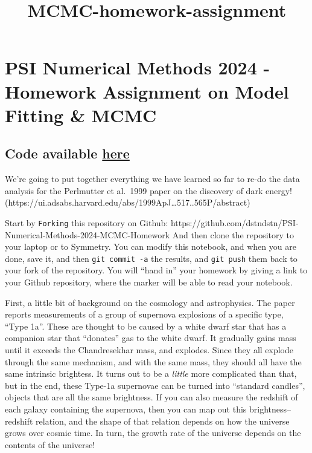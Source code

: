 \documentclass[11pt]{article}
\title{MCMC-homework-assignment}
\begin{document}
    
    \maketitle
    
    

    
    \hypertarget{psi-numerical-methods-2024---homework-assignment-on-model-fitting-mcmc}{%
\section{PSI Numerical Methods 2024 - Homework Assignment on Model
Fitting \&
MCMC}\label{psi-numerical-methods-2024---homework-assignment-on-model-fitting-mcmc}}

    \hypertarget{code-available-here}{%
\subsection{\texorpdfstring{Code available
\href{https://github.com/JLGouws/PSI-Numerical-Methods-2024-MCMC-Homework1}{here}}{Code available here}}\label{code-available-here}}

    We're going to put together everything we have learned so far to re-do
the data analysis for the Perlmutter et al.~1999 paper on the discovery
of dark energy!
(https://ui.adsabs.harvard.edu/abs/1999ApJ\ldots517..565P/abstract)

Start by \texttt{Forking} this repository on Github:
https://github.com/dstndstn/PSI-Numerical-Methods-2024-MCMC-Homework And
then clone the repository to your laptop or to Symmetry. You can modify
this notebook, and when you are done, save it, and then
\texttt{git\ commit\ -a} the results, and \texttt{git\ push} them back
to your fork of the repository. You will ``hand in'' your homework by
giving a link to your Github repository, where the marker will be able
to read your notebook.

First, a little bit of background on the cosmology and astrophysics. The
paper reports measurements of a group of supernova explosions of a
specific type, ``Type 1a''. These are thought to be caused by a white
dwarf star that has a companion star that ``donates'' gas to the white
dwarf. It gradually gains mass until it exceeds the Chandresekhar mass,
and explodes. Since they all explode through the same mechanism, and
with the same mass, they should all have the same intrinsic brightess.
It turns out to be a \emph{little} more complicated than that, but in
the end, these Type-1a supernovae can be turned into ``standard
candles'', objects that are all the same brightness. If you can also
measure the redshift of each galaxy containing the supernova, then you
can map out this brightness--redshift relation, and the shape of that
relation depends on how the universe grows over cosmic time. In turn,
the growth rate of the universe depends on the contents of the universe!
\end{document}
